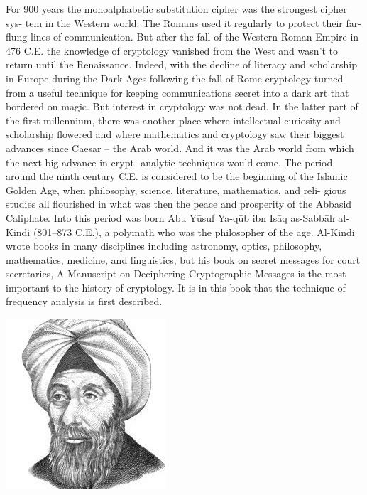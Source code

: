 \documentclass{report}
\theoremstyle{definition}
\begin{document}
{{\Large{For 900 years the monoalphabetic substitution cipher was the strongest cipher sys-
tem in the Western world. The Romans used it regularly to protect their far-flung
lines of communication. But after the fall of the Western Roman Empire in 476 C.E.
the knowledge of cryptology vanished from the West and wasn’t to return until the
Renaissance. Indeed, with the decline of literacy and scholarship in Europe during
the Dark Ages following the fall of Rome cryptology turned from a useful technique
for keeping communications secret into a dark art that bordered on magic.
But interest in cryptology was not dead. In the latter part of the first millennium,
there was another place where intellectual curiosity and scholarship flowered and
where mathematics and cryptology saw their biggest advances since Caesar – the
Arab world. And it was the Arab world from which the next big advance in crypt-
analytic techniques would come.
The period around the ninth century C.E. is considered to be the beginning of the
Islamic Golden Age, when philosophy, science, literature, mathematics, and reli-
gious studies all flourished in what was then the peace and prosperity of the Abbasid
Caliphate. Into this period was born Abu Yūsuf Ya-qūb ibn Isāq as-Sabbāh al-Kindi
(801–873 C.E.), a polymath who was the philosopher of the age. Al-Kindi wrote
books in many disciplines including astronomy, optics, philosophy, mathematics,
medicine, and linguistics, but his book on secret messages for court secretaries, A
Manuscript on Deciphering Cryptographic Messages is the most important to the
history of cryptology. It is in this book that the technique of frequency analysis is
first described.}

\begin{center}

\includegraphics[scale=0.6]{"al_kindi.png"}
\end{center}


}}
\end{document}
